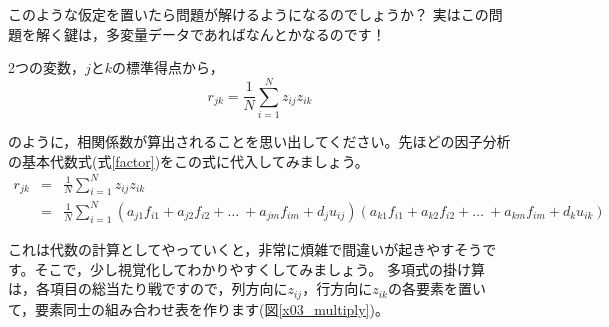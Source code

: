\documentclass{ltjsbook}
\begin{document}
このような仮定を置いたら問題が解けるようになるのでしょうか？ 実はこの問題を解く鍵は，多変量データであればなんとかなるのです！

2つの変数，$j$と$k$の標準得点から，
\begin{equation}
    r_{jk}=\frac{1}{N} \sum_{i=1}^{N} z_{ij}z_{ik}
\end{equation}

のように，相関係数が算出されることを思い出してください。先ほどの因子分析の基本代数式(式\ref{factor})をこの式に代入してみましょう。
\begin{equation}
    \begin{array}{ccl}
        r_{jk} & = & \displaystyle{\frac{1}{N} \sum_{i=1}^{N} z_{ij}z_{ik}}                                                                                                                  \\
               & = & \displaystyle{\frac{1}{N} \sum_{i=1}^{N}}(a_{j1}f_{i1}+a_{j2}f_{i2}+ \ldots \ +a_{jm}f_{im}+d_{j}u_{ij})(a_{k1}f_{i1}+a_{k2}f_{i2}+ \ldots \ +a_{km}f_{im}+d_{k}u_{ik})
    \end{array}
\end{equation}

これは代数の計算としてやっていくと，非常に煩雑で間違いが起きやすそうです。そこで，少し視覚化してわかりやすくしてみましょう。
多項式の掛け算は，各項目の総当たり戦ですので，列方向に$z_{ij}$，行方向に$z_{ik}$の各要素を置いて，要素同士の組み合わせ表を作ります(図\ref{x03_multiply})。
\end{document}
